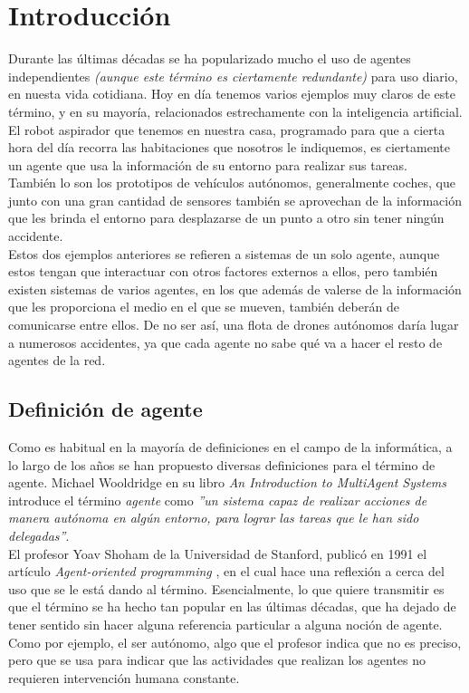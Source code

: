 \chapter{Introducción}
\label{chap:introduccion}

Durante las últimas décadas se ha popularizado mucho el uso de agentes independientes \textit{(aunque este término es ciertamente redundante)} para uso diario, en nuesta vida cotidiana. Hoy en día tenemos varios ejemplos muy claros de este término, y en su mayoría, relacionados estrechamente con la inteligencia artificial.\\

El robot aspirador que tenemos en nuestra casa, programado para que a cierta hora del día recorra las habitaciones que nosotros le indiquemos, es ciertamente un agente que usa la información de su entorno para realizar sus tareas.\\

También lo son los prototipos de vehículos autónomos, generalmente coches, que junto con una gran cantidad de sensores también se aprovechan de la información que les brinda el entorno para desplazarse de un punto a otro sin tener ningún accidente.\\

Estos dos ejemplos anteriores se refieren a sistemas de un solo agente, aunque estos tengan que interactuar con otros factores externos a ellos, pero también existen sistemas de varios agentes, en los que además de valerse de la información que les proporciona el medio en el que se mueven, también deberán de comunicarse entre ellos. De no ser así, una flota de drones autónomos daría lugar a numerosos accidentes, ya que cada agente no sabe qué va a hacer el resto de agentes de la red.

\section{Definición de agente}

Como es habitual en la mayoría de definiciones en el campo de la informática, a lo largo de los años se han propuesto diversas definiciones para el término de agente. Michael Wooldridge en su libro \textit{An Introduction to MultiAgent Systems} \cite{wooldridge-2009} introduce el término \textit{agente} como \textit{''un sistema capaz de realizar acciones de manera autónoma en algún entorno, para lograr las tareas que le han sido delegadas''}.\\

El profesor Yoav Shoham de la Universidad de Stanford, publicó en 1991 el artículo \textit{Agent-oriented programming} \cite{Shoham}, en el cual hace una reflexión a cerca del uso que se le está dando al término. Esencialmente, lo que quiere transmitir es que el término se ha hecho tan popular en las últimas décadas, que ha dejado de tener sentido sin hacer alguna referencia particular a alguna noción de agente. Como por ejemplo, el ser autónomo, algo que el profesor indica que no es preciso, pero que se usa para indicar que las actividades que realizan los agentes no requieren intervención humana constante.\\

